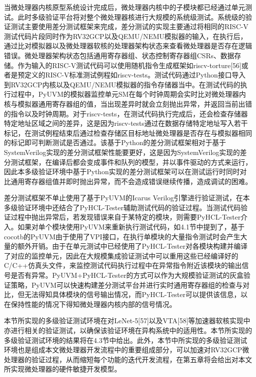 当微处理器内核原型系统设计完成后，微处理器内核中的子模块都已经通过单元测试。此时多级验证平台将对整个微处理器核进行大规模的系统级测试。系统级的验证测试主要使用差分测试框架来完成，差分测试的实现主要通过将相同的RISC-V测试代码片段同时作为RV32GCP以及QEMU/NEMU模拟器的输入，在执行后，通过比对模拟器以及微处理器软核的处理器架构状态来查看微处理器是否存在逻辑错误。微处理器架构状态包括通用寄存器组、状态控制寄存器组CSRs、数据存储。作为输入的RISC-V测试代码可以使用随机指令生成框架如riscv-torture[56]或者是预定义的RISC-V标准测试例程如riscv-tests。测试代码通过Python接口导入到RV32GCP内核以及QEMU/NEMU模拟器的指令存储器当中。在测试代码的执行过程中，PyUVM的模拟器监控单元SM在每个时钟周期会实时比对微处理器内核与模拟器通用寄存器组的值，当出现差异时就会立刻抛出异常，并返回当前出错的指令以及时钟周期。对于riscv-tests，在测试代码执行完成后，还会检查存储器特定地址区域之间的差异，这是因为riscv-tests通过在数据存储特定地址写入若干标记，在测试例程结束后通过检查存储区目标地址微处理器是否存在与模拟器相同的标记即可判断测试是否通过。该基于Python的差分测试框架相对于基于SystemVerilog实现的差分测试框架性能要更好，这是因为SystemVerilog实现的差分测试框架，在编译后都会变成事件和队列的模型，并以事件驱动的方式来运行，因此本多级验证环境中基于Python实现的差分测试框架可以在测试运行时同时对比通用寄存器组值并即时抛出异常，而不会造成错误继续传播，造成调试的困难。

差分测试框架不单止使用了基于PyUVM的Icarus Verilog引擎进行验证测试，在本多级验证环境中还结合了PyHCL-Tester辅助测试代码的验证过程。当测试代码验证过程中抛出异常后，若发现错误来自于某特定的模块，则需要PyHCL-Tester介入。如果对单个模块使用PyUVM来重新执行测试代码，如4.1节中提到了，基于cocotb的PyUVM由于使用了VPI接口，在执行单模块的大量指令测试时会产生大量的额外开销。由于在单元测试中已经使用了PyHCL-Tester对各模块构建并编译了对应的监控单元，因此在大规模集成验证测试中可以重用这些已经编译好的C/C++仿真头文件，来监控测试代码执行过程中在异常指令附近该模块的输出信号是否有异常。PyUVM+PyHCL-Tester的方式可以作为大规模验证测试的灰盒验证策略，PyUVM可以快速构建差分测试平台并进行实时通用寄存器组的检查与对比，但无法得知具体模块的信号输出情况，而PyHCL-Tester可以提供该信息，以在保持性能的情况下得知微处理器内核内部的信号情况。

本节所实现的多级验证测试环境在对LeNet-5[57]以及VTA[58]等加速器软核实现中亦进行相关的验证测试，以确保该验证环境在异构系统中的适用性。本节所实现的多级验证测试环境的结果将在4.3节中给出。此外，本节中所实现的多级验证测试环境也是组成本文微处理器开发流程中的重要组成部分，可以加速对RV32GCP微处理器的验证过程，从而缩短每个功能的迭代开发流程，在第五章将会给出对本文所实现微处理器的硬件敏捷开发模型。

